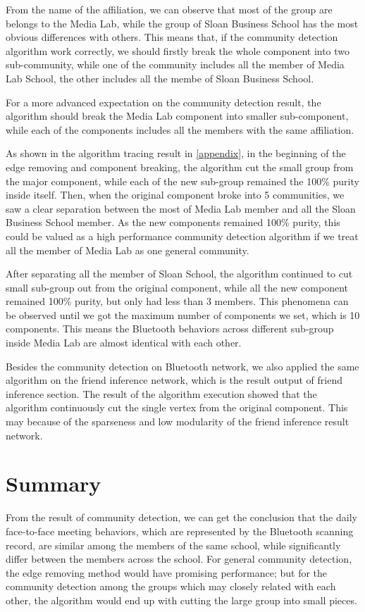 \documentclass[11pt]{article}
\begin{document}
From the name of the affiliation, we can observe that most of the group are belongs to the Media Lab, while the group of Sloan Business School has the most obvious differences with others. This means that, if the community detection algorithm work correctly, we should firstly break the whole component into two sub-community, while one of the community includes all the member of Media Lab School, the other includes all the membe of Sloan Business School.

For a more advanced expectation on the community detection result, the algorithm should break the Media Lab component into smaller sub-component, while each of the components includes all the members with the same affiliation.

As shown in the algorithm tracing result in \ref{appendix}, in the beginning of the edge removing and component breaking, the algorithm cut the small group from the major component, while each of the new sub-group remained the 100\% purity inside itself. Then, when the original component broke into 5 communities, we saw a clear separation between the most of Media Lab member and all the Sloan Business School member. As the new components remained 100\% purity, this could be valued as a high performance community detection algorithm if we treat all the member of Media Lab as one general community.

After separating all the member of Sloan School, the algorithm continued to cut small sub-group out from the original component, while all the new component remained 100\% purity, but only had less than 3 members. This phenomena can be observed until we got the maximum number of components we set, which is 10 components. This means the Bluetooth behaviors across different sub-group inside Media Lab are almost identical with each other. 

Besides the community detection on Bluetooth network, we also applied the same algorithm on the friend inference network, which is the result output of friend inference section. The result of the algorithm execution showed that the algorithm continuously cut the single vertex from the original component. This may because of the sparseness and low modularity of the friend inference result network.

\section{Summary}\label{summary}
From the result of community detection, we can get the conclusion that the daily face-to-face meeting behaviors, which are represented by the Bluetooth scanning record, are similar among the members of the same school, while significantly differ between the members across the school. For general community detection, the edge removing method would have promising performance; but for the community detection among the groups which may closely related with each other, the algorithm would end up with cutting the large group into small pieces.
\end{document}
